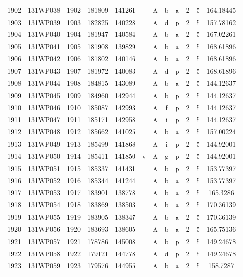 \begin{tabular}{|*{12}{c|}}
1902 & 131WP038 & 1902 & 181809 & 141261 &  & A & b & a & 2 & 5 & 164.18445 \\ 
1903 & 131WP039 & 1903 & 182825 & 140228 &  & A & d & p & 2 & 5 & 157.78162 \\ 
1904 & 131WP040 & 1904 & 181947 & 140584 &  & A & b & a & 2 & 5 & 167.02261 \\ 
1905 & 131WP041 & 1905 & 181908 & 139829 &  & A & b & a & 2 & 5 & 168.61896 \\ 
1906 & 131WP042 & 1906 & 181802 & 140146 &  & A & b & a & 2 & 5 & 168.61896 \\ 
1907 & 131WP043 & 1907 & 181972 & 140083 &  & A & d & p & 2 & 5 & 168.61896 \\ 
1908 & 131WP044 & 1908 & 184815 & 143089 &  & A & b & a & 2 & 5 & 144.12637 \\ 
1909 & 131WP045 & 1909 & 184960 & 142944 &  & A & b & p & 2 & 5 & 144.12637 \\ 
1910 & 131WP046 & 1910 & 185087 & 142993 &  & A & f & p & 2 & 5 & 144.12637 \\ 
1911 & 131WP047 & 1911 & 185171 & 142958 &  & A & i & p & 2 & 5 & 144.12637 \\ 
1912 & 131WP048 & 1912 & 185662 & 141025 &  & A & b & a & 2 & 5 & 157.00224 \\ 
1913 & 131WP049 & 1913 & 185499 & 141868 &  & A & i & p & 2 & 5 & 144.92001 \\ 
1914 & 131WP050 & 1914 & 185411 & 141850 & v & A & g & p & 2 & 5 & 144.92001 \\ 
1915 & 131WP051 & 1915 & 185337 & 141431 &  & A & b & p & 2 & 5 & 153.77397 \\ 
1916 & 131WP052 & 1916 & 185344 & 141244 &  & A & b & a & 2 & 5 & 153.77397 \\ 
1917 & 131WP053 & 1917 & 183901 & 138778 &  & A & b & a & 2 & 5 & 165.3286 \\ 
1918 & 131WP054 & 1918 & 183869 & 138503 &  & A & b & a & 2 & 5 & 170.36139 \\ 
1919 & 131WP055 & 1919 & 183905 & 138347 &  & A & b & a & 2 & 5 & 170.36139 \\ 
1920 & 131WP056 & 1920 & 183693 & 138605 &  & A & b & a & 2 & 5 & 165.75136 \\ 
1921 & 131WP057 & 1921 & 178786 & 145008 &  & A & b & p & 2 & 5 & 149.24678 \\ 
1922 & 131WP058 & 1922 & 179121 & 144778 &  & A & d & p & 2 & 5 & 149.24678 \\ 
1923 & 131WP059 & 1923 & 179576 & 144955 &  & A & b & a & 2 & 5 & 158.7287 \\ 

\end{tabular}

